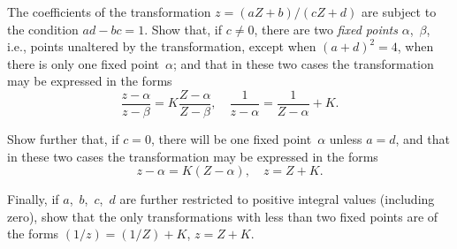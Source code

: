The coefficients of the transformation $z = (aZ + b)/(cZ + d)$ are subject
to the condition $ad - bc = 1$.    Show that, if $c \neq 0$, there are two \emph{fixed points}
$\alpha$,~$\beta$, i.e., points unaltered by the transformation, except when $(a + d)^{2} = 4$, when
there is only one fixed point~$\alpha$; and that in these two cases the transformation
may be expressed in the forms
\[
\frac{z - \alpha}{z - \beta} = K\frac{Z - \alpha}{Z - \beta},\quad
\frac{1}{z - \alpha} = \frac{1}{Z - \alpha} + K.
\]

Show further that, if $c = 0$, there will be one fixed point~$\alpha$ unless $a = d$,
and that in these two cases the transformation may be expressed in the
forms
\[
z - \alpha = K(Z - \alpha),\quad
z = Z + K.
\]

Finally, if $a$,~$b$,~$c$,~$d$ are further restricted to positive integral values (including
zero), show that the only transformations with less than two fixed
points are of the forms $(1/z) = (1/Z) + K$, $z = Z + K$. 

